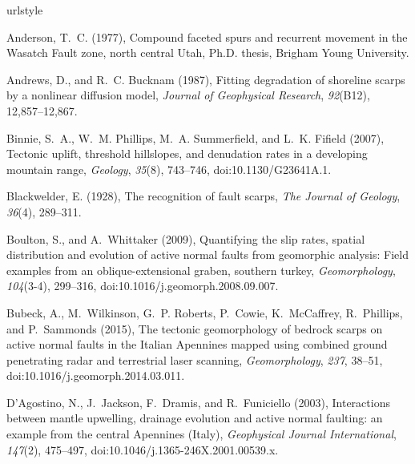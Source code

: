 \begin{thebibliography}{41}
\providecommand{\natexlab}[1]{#1}
\expandafter\ifx\csname urlstyle\endcsname\relax
  \providecommand{\doi}[1]{doi:\discretionary{}{}{}#1}\else
  \providecommand{\doi}{doi:\discretionary{}{}{}\begingroup
  \urlstyle{rm}\Url}\fi

Anderson, T.~C. (1977), {Compound faceted spurs and recurrent movement in the
  Wasatch Fault zone, north central Utah}, Ph.D. thesis, Brigham Young
  University.

Andrews, D., and R.~C. Bucknam (1987), Fitting degradation of shoreline scarps
  by a nonlinear diffusion model, \textit{Journal of Geophysical Research},
  \textit{92}(B12), 12,857--12,867.

Binnie, S.~A., W.~M. Phillips, M.~A. Summerfield, and L.~K. Fifield (2007),
  Tectonic uplift, threshold hillslopes, and denudation rates in a developing
  mountain range, \textit{Geology}, \textit{35}(8), 743--746,
  \doi{10.1130/G23641A.1}.

Blackwelder, E. (1928), The recognition of fault scarps, \textit{The Journal of
  Geology}, \textit{36}(4), 289--311.

Boulton, S., and A.~Whittaker (2009), Quantifying the slip rates, spatial
  distribution and evolution of active normal faults from geomorphic analysis:
  Field examples from an oblique-extensional graben, southern turkey,
  \textit{Geomorphology}, \textit{104}(3-4), 299--316,
  \doi{10.1016/j.geomorph.2008.09.007}.

Bubeck, A., M.~Wilkinson, G.~P. Roberts, P.~Cowie, K.~McCaffrey, R.~Phillips,
  and P.~Sammonds (2015), {The tectonic geomorphology of bedrock scarps on
  active normal faults in the Italian Apennines mapped using combined ground
  penetrating radar and terrestrial laser scanning}, \textit{Geomorphology},
  \textit{237}, 38--51, \doi{10.1016/j.geomorph.2014.03.011}.

D'Agostino, N., J.~Jackson, F.~Dramis, and R.~Funiciello (2003), {Interactions
  between mantle upwelling, drainage evolution and active normal faulting: an
  example from the central Apennines (Italy)}, \textit{Geophysical Journal
  International}, \textit{147}(2), 475--497,
  \doi{10.1046/j.1365-246X.2001.00539.x}.


\end{thebibliography}
